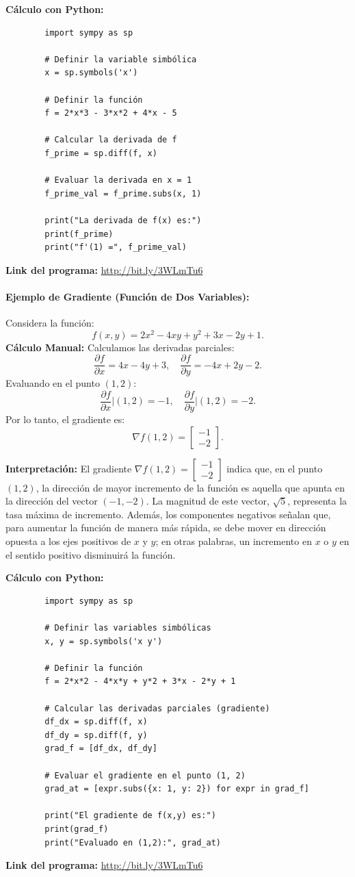 \documentclass[12pt,a4,oneside]{book}
\begin{document}
	\textbf{Cálculo con Python:}
	\begin{verbatim}
		import sympy as sp
		
		# Definir la variable simbólica
		x = sp.symbols('x')
		
		# Definir la función
		f = 2*x*3 - 3*x*2 + 4*x - 5
		
		# Calcular la derivada de f
		f_prime = sp.diff(f, x)
		
		# Evaluar la derivada en x = 1
		f_prime_val = f_prime.subs(x, 1)
		
		print("La derivada de f(x) es:")
		print(f_prime)
		print("f'(1) =", f_prime_val)
	\end{verbatim}
	\textbf{Link del programa:} \url{http://bit.ly/3WLmTu6}
	
	\paragraph{Ejemplo de Gradiente (Función de Dos Variables):}  
	Considera la función:
	\[
	f(x,y) = 2x^2 - 4xy + y^2 + 3x - 2y + 1.
	\]
	\textbf{Cálculo Manual:}  
	Calculamos las derivadas parciales:
	\[
	\frac{\partial f}{\partial x} = 4x - 4y + 3, \quad \frac{\partial f}{\partial y} = -4x + 2y - 2.
	\]
	Evaluando en el punto \( (1,2) \):
	\[
	\frac{\partial f}{\partial x}\Big|{(1,2)} = -1, \quad \frac{\partial f}{\partial y}\Big|{(1,2)} = -2.
	\]
	Por lo tanto, el gradiente es:
	\[
	\nabla f(1,2) = \begin{bmatrix} -1 \\ -2 \end{bmatrix}.
	\]
	
	\textbf{Interpretación:}  
	El gradiente \( \nabla f(1,2) = \begin{bmatrix} -1 \\ -2 \end{bmatrix} \) indica que, en el punto \( (1,2) \), la dirección de mayor incremento de la función es aquella que apunta en la dirección del vector \((-1,-2)\). La magnitud de este vector, \(\sqrt{5}\), representa la tasa máxima de incremento. Además, los componentes negativos señalan que, para aumentar la función de manera más rápida, se debe mover en dirección opuesta a los ejes positivos de \( x \) y \( y \); en otras palabras, un incremento en \( x \) o \( y \) en el sentido positivo disminuirá la función.
	
	\textbf{Cálculo con Python:}
	\begin{verbatim}
		import sympy as sp
		
		# Definir las variables simbólicas
		x, y = sp.symbols('x y')
		
		# Definir la función
		f = 2*x*2 - 4*x*y + y*2 + 3*x - 2*y + 1
		
		# Calcular las derivadas parciales (gradiente)
		df_dx = sp.diff(f, x)
		df_dy = sp.diff(f, y)
		grad_f = [df_dx, df_dy]
		
		# Evaluar el gradiente en el punto (1, 2)
		grad_at = [expr.subs({x: 1, y: 2}) for expr in grad_f]
		
		print("El gradiente de f(x,y) es:")
		print(grad_f)
		print("Evaluado en (1,2):", grad_at)
	\end{verbatim}
	\textbf{Link del programa:} \url{http://bit.ly/3WLmTu6}
	
\end{document}
